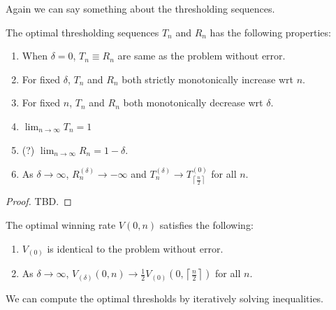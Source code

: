 Again we can say something about the thresholding sequences.

\begin{theorem}
	The optimal thresholding sequences $T_n$ and $R_n$ has the following properties:
	\begin{enumerate}
		\item When $\delta = 0$, $T_n \equiv R_n$ are same as the problem without error.
		 \item For fixed $\delta$,  $T_n$ and $R_n$ both strictly monotonically increase wrt $n$.
		 \item For fixed $n$, $T_n$ and $R_n$ both monotonically decrease wrt $\delta$.
		\item  $\lim_{n \to \infty} T_n = 1$
		\item (?) $\lim_{n \to \infty} R_n = 1-\delta$.
		\item As $\delta \to \infty$, $R_n^{(\delta)} \to  -\infty$ and $T_n^{(\delta)} \to  T_{\left\lceil \frac{n}{2} \right\rceil }^{(0)}$ for all $n$.
	\end{enumerate}
\end{theorem}
\begin{proof}
	TBD.
\end{proof}

\begin{corollary}
	The optimal winning rate $V(0,n)$ satisfies the following:
	\begin{enumerate}
		\item $V_{(0)}$ is identical to the problem without error.
		\item As $\delta \to \infty$, $V_{(\delta)}(0,n) \to \frac{1}{2} V_{(0)}(0,\left\lceil \frac{n}{2} \right\rceil )$ for all $n$.
	\end{enumerate}
\end{corollary}

We can compute the optimal thresholds by iteratively solving inequalities.
	
